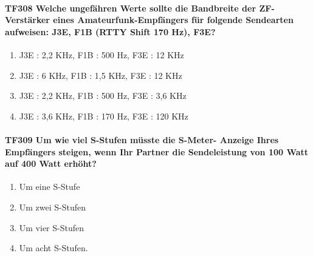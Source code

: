 \documentclass[8pt]{article}
\begin{document}
\paragraph*{TF308 Welche ungefähren Werte sollte die Bandbreite der ZF-Verstärker eines Amateurfunk-Empfängers für folgende Sendearten aufweisen: J3E, F1B (RTTY Shift 170 Hz), F3E?}
\begin{enumerate}[nolistsep,label=\Alph*]
\item J3E : 2,2 KHz, F1B : 500 Hz, F3E : 12 KHz
\item J3E : 6 KHz, F1B : 1,5 KHz, F3E : 12 KHz
\item J3E : 2,2 KHz, F1B : 500 Hz, F3E : 3,6 KHz
\item J3E : 3,6 KHz, F1B : 170 Hz, F3E : 120 KHz
\end{enumerate}

\paragraph*{TF309 Um wie viel S-Stufen müsste die S-Meter- Anzeige Ihres Empfängers steigen, wenn Ihr Partner die Sendeleistung von 100 Watt auf 400 Watt erhöht?}
\begin{enumerate}[nolistsep,label=\Alph*]
\item Um eine S-Stufe
\item Um zwei S-Stufen
\item Um vier S-Stufen
\item Um acht S-Stufen.
\end{enumerate}
\end{document}
